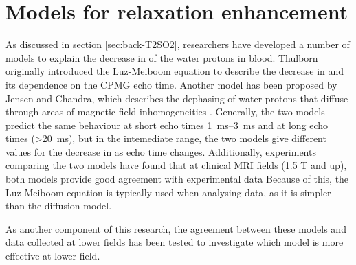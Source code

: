 \chapter{Models for \Ttwo relaxation enhancement}\label{ch:models}

As discussed in section \ref{sec:back-T2SO2}, researchers have developed a number of models to explain the decrease in \Ttwo of the water protons in blood.
Thulborn originally introduced the Luz-Meiboom equation to describe the decrease in \Ttwo and its dependence on the CPMG echo time\cite{ThulbornOxygenationdependencetransverse1982}.
Another model has been proposed by Jensen and Chandra, which describes the dephasing of water protons that diffuse through areas of magnetic field inhomogeneities \cite{JensenNMRrelaxationtissues2000}.
Generally, the two models predict the same behaviour at short echo times \SIrange{1}{3}{ms} and at long echo times (\SI{>20}{ms})\cite{BrooksT2shorteningweaklymagnetized2001}, but in the intemediate range, the two models give different values for the decrease in \Ttwo as echo time changes.
Additionally, experiments comparing the two models have found that at clinical MRI fields (1.5 T and up), both models provide good agreement with experimental data \cite{StefanovicHumanwholebloodrelaxometry2004,ChenHumanwholeblood2009,GardenerDependencebloodR22010,GrgacTransversewaterrelaxation2017}
Because of this, the Luz-Meiboom equation is typically used when analysing data, as it is simpler than the diffusion model.

As another component of this research, the agreement between these models and data collected at lower fields has been tested to investigate which model is more effective at lower field.

